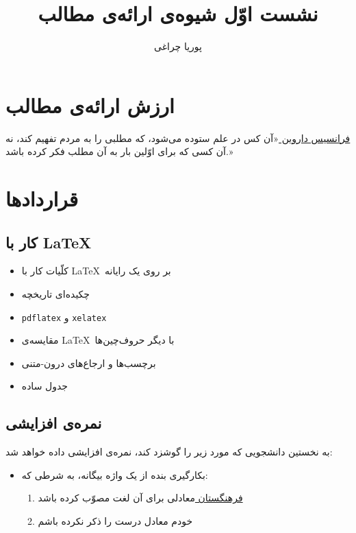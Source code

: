 \documentclass{article}
\begin{document}
\title{نشست‌ اوّل شیوه‌ی ارائه‌ی مطالب}
\author{پوریا چراغی}
\maketitle
\section{ارزش ارائه‌ی مطالب}
\begin{pquotation}{\href{https://fa.wikipedia.org/wiki/\%D9\%81\%D8\%B1\%D8\%A7\%D9\%86\%D8\%B3\%DB\%8C\%D8\%B3\_\%D8\%AF\%D8\%A7\%D8\%B1\%D9\%88\%DB\%8C\%D9\%86}{فرانسیس داروین }} 
«آن کس در علم ستوده می‌شود، که مطلبی را به مردم تفهیم کند، نه آن کسی که برای اوّلین بار به آن مطلب فکر کرده باشد.»
\end{pquotation}
\section{قرارداد‌ها}
\subsection{کار با \LaTeX}
\begin{itemize}
\item کلّیات کار با \LaTeX~بر روی یک رایانه
\item چکیده‌ای تاریخچه
\item \texttt{pdflatex} و \texttt{xelatex}
\item مقایسه‌ی \LaTeX~با دیگر حروف‌چین‌ها
\item برچسب‌ها و ارجاع‌های درون-متنی
\item جدول ساده
\end{itemize}
\subsection{نمره‌ی افزایشی}
به نخستین دانشجویی که مورد زیر را گوشزد کند،‌ نمره‌ی افزایشی داده خواهد شد:
\begin{itemize}
\item بکارگیری بنده از یک واژه بیگانه، به شرطی که:
\begin{enumerate}
\item \href{https://wiki.apll.ir/word/index.php/%d8%b5%d9%81%d8%ad%d9%87%d9%94_%d8%a7%d8%b5%d9%84%db%8c}{فرهنگستان }معادلی برای آن لغت مصوّب کرده باشد
\item خودم معادل درست را ذکر نکرده باشم
\end{enumerate}
\end{itemize}
\end{document}
